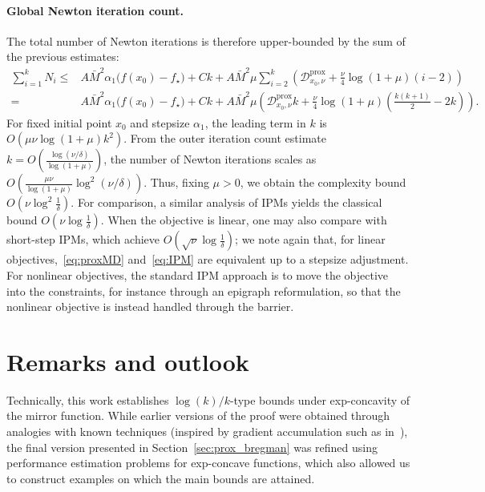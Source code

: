 \documentclass[a4paper]{article}
\renewcommand{\leq}{\leqslant}
\newcommand{\Dxzero}{\mathcal{D}_{x_0,\nu}}
\newcommand{\Dxzeroprox}{\Dxzero^{\mathrm{prox}}}
\begin{document}
\paragraph{Global Newton iteration count.}
The total number of Newton iterations is therefore upper-bounded by the sum of the previous estimates:
\begin{align*}
        \sum_{i=1}^k N_i
        \leq{}&
        A\bar{M}^2 \alpha_1 \bigl(f(x_0)-f_\star\bigr) + C k + A \bar{M}^2 \mu \sum_{i=2}^k \left( \Dxzeroprox + \frac{\nu}{4} \log(1+\mu) (i-2) \right)
        \\
        ={}&
        A\bar{M}^2 \alpha_1 \bigl(f(x_0)-f_\star\bigr) + C k + A \bar{M}^2 \mu \left( \Dxzeroprox k + \frac{\nu}{4} \log(1+\mu) \left(\frac{k(k+1)}{2}-2k\right) \right)
        .
\end{align*}
For fixed initial point $x_0$ and stepsize $\alpha_1$, the leading term in $k$ is $O\left( \mu \nu \log(1+\mu) k^2 \right)$.
From the outer iteration count estimate $k = O\left( \frac{\log(\nu/\delta)}{\log(1+\mu)} \right)$, the number of Newton iterations scales as $O\left( \frac{\mu \nu}{\log(1+\mu)} \log^2(\nu/\delta) \right)$.
Thus, fixing $\mu>0$, we obtain the complexity bound $O\left( \nu\log^2\tfrac{1}{\delta} \right)$.
For comparison, a similar analysis of IPMs yields the classical bound \(O(\nu \log \tfrac{1}{\delta})\).
When the objective is linear, one may also compare with short-step IPMs, which achieve \(O(\sqrt{\nu}\log \tfrac{1}{\delta})\); we note again that, for linear objectives,~\eqref{eq:proxMD} and~\eqref{eq:IPM} are equivalent up to a stepsize adjustment.
For nonlinear objectives, the standard IPM approach is to move the objective into the constraints, for instance through an epigraph reformulation, so that the nonlinear objective is instead handled through the barrier.

\section{Remarks and outlook}

Technically, this work establishes $\log(k)/k$-type bounds under exp-concavity of the mirror function.
While earlier versions of the proof were obtained through analogies with known techniques (inspired by gradient accumulation such as in~\cite{teboulle2023elementary}), the final version presented in Section~\ref{sec:prox_bregman} was refined using performance estimation problems for exp-concave functions, which also allowed us to construct examples on which the main bounds are attained.
\end{document}
